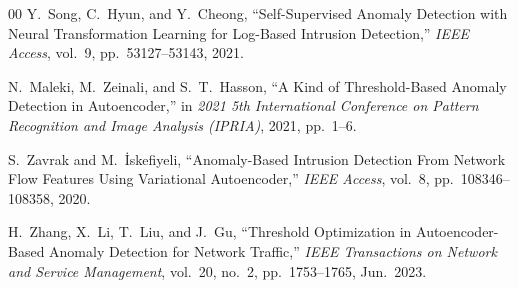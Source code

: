 \documentclass[conference]{IEEEtran}
\begin{document}
\begin{thebibliography}{00}
Y.~Song, C.~Hyun, and Y.~Cheong,
``Self-Supervised Anomaly Detection with Neural Transformation
Learning for Log-Based Intrusion Detection,''
\textit{IEEE Access},
vol.~9, pp.~53127--53143, 2021.

N.~Maleki, M.~Zeinali, and S.~T.~Hasson,
``A Kind of Threshold-Based Anomaly Detection in Autoencoder,''
in \textit{2021 5th International Conference on Pattern Recognition
and Image Analysis (IPRIA)}, 2021, pp.~1--6.

S.~Zavrak and M.~{\.I}skefiyeli,
``Anomaly-Based Intrusion Detection From Network Flow Features
Using Variational Autoencoder,''
\textit{IEEE Access},
vol.~8, pp.~108346--108358, 2020.

H.~Zhang, X.~Li, T.~Liu, and J.~Gu,
``Threshold Optimization in Autoencoder-Based Anomaly Detection
for Network Traffic,''
\textit{IEEE Transactions on Network and Service Management},
vol.~20, no.~2, pp.~1753--1765, Jun.~2023.

\end{thebibliography}
\end{document}
